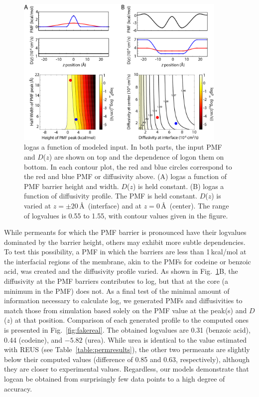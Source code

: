 \begin{figure}[!htbp]
\begin{center}
\includegraphics[width=0.9\textwidth]{Figures/models}
\caption[log\perm as a function of modeled inputs]{log\perm as a function of modeled input.  In both parts, the input PMF and $D$($z$) are shown on top and the dependence of log\perm on them on bottom.  In each contour plot, the red and blue circles correspond to the red and blue PMF or diffusivity above.  (A) log\perm as a function of PMF barrier height and width.  $D$($z$) is held constant.  (B) log\perm as a function of diffusivity profile.  The PMF is held constant.  $D$($z$) is varied at $z=\pm 20$\,\AA~(interface) and at $z=0$\,\AA~(center).  The range of log\perm values is 0.55 to 1.55, with contour values given in the figure.}
\label{fig:models}
\end{center}
\end{figure}

\par While permeants for which the PMF barrier is pronounced have their log\perm values dominated by the barrier height, others may exhibit more subtle dependencies.  To test this possibility, a PMF in which the barriers are less than 1\,kcal/mol at the interfacial regions of the membrane, akin to the PMFs for codeine or benzoic acid, was created and the diffusivity profile varied.  As shown in Fig.~\ref{fig:models}B, the diffusivity at the PMF barriers contributes to log\perm, but that at the core (a minimum in the PMF) does not.  As a final test of the minimal amount of information necessary to calculate log\perm, we generated PMFs and diffusivities to match those from simulation based solely on the PMF value at the peak(s) and $D$($z$) at that position.  Comparison of each generated profile to the computed ones is presented in Fig.~\ref{fig:fakereal}.  The obtained log\perm values are 0.31 (benzoic acid), 0.44 (codeine), and $-5.82$ (urea).  While urea is identical to the value estimated with REUS (see Table~\ref{table:permresults}), the other two permeants are slightly below their computed values (difference of 0.85 and 0.63, respectively), although they are closer to experimental values.  Regardless, our models demonstrate that log\perm can be obtained from surprisingly few data points to a high degree of accuracy.

